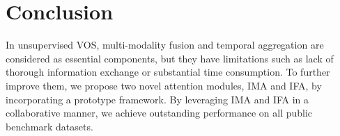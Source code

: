 \documentclass[10pt,twocolumn,letterpaper]{article}
\begin{document}
\section{Conclusion}
In unsupervised VOS, multi-modality fusion and temporal aggregation are considered as essential components, but they have limitations such as lack of thorough information exchange or substantial time consumption. To further improve them, we propose two novel attention modules, IMA and IFA, by incorporating a prototype framework. By leveraging IMA and IFA in a collaborative manner, we achieve outstanding performance on all public benchmark datasets.






{\small


}
\end{document}
